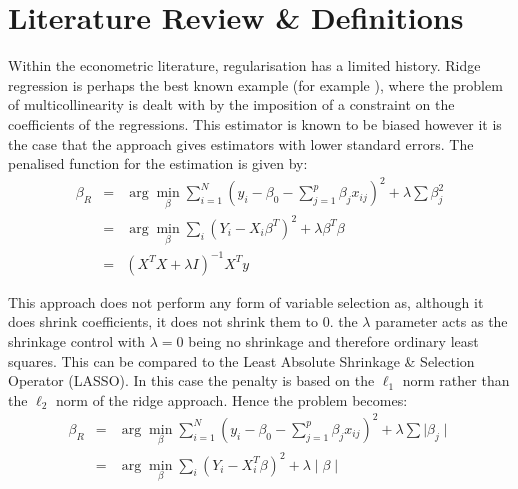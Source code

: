 \documentclass[11pt]{article}
\begin{document}
\section{Literature Review \& Definitions}
Within the econometric literature, regularisation has a limited history. Ridge regression is perhaps the best known example (for example \cite{hoerl1970}), where the problem of multicollinearity is dealt with by the imposition of a constraint on the coefficients of the regressions. This estimator is known to be biased however it is the case that the approach gives estimators with lower standard errors. The penalised function for the estimation is given by:
\begin{eqnarray}
\beta_R&=&\arg\min_\beta \sum_{i=1}^N(y_i-\beta_0-\sum_{j=1}^p \beta_j x_{ij})^2+\lambda \sum \beta_j^2\\
&=&\arg\min_\beta \sum_i \left(Y_i-X_i\beta^T\right)^2+\lambda\beta^T\beta \nonumber \\
&=&\left(X^TX+\lambda I\right)^{-1}X^T y \nonumber
\end{eqnarray}

This approach does not perform any form of variable selection  as, although it does shrink coefficients, it does not shrink them to 0. the $\lambda$ parameter acts as the shrinkage control with $\lambda=0$ being no shrinkage and therefore ordinary least squares. This can be compared to the Least Absolute Shrinkage \& Selection Operator (LASSO). In this case the penalty is based on the $\ell_1$ norm rather than the $\ell_2$ norm of the ridge approach. Hence the problem becomes:
\begin{eqnarray}
\beta_R&=&\arg\min_\beta \sum_{i=1}^N(y_i-\beta_0-\sum_{j=1}^p \beta_j x_{ij})^2+\lambda \sum \mid\beta_j\mid\\
&=&\arg\min_\beta \sum_i \left(Y_i-X_i^T\beta\right)^2+\lambda\mid\beta\mid \nonumber 
\end{eqnarray}\label{lassodef}
\end{document}

